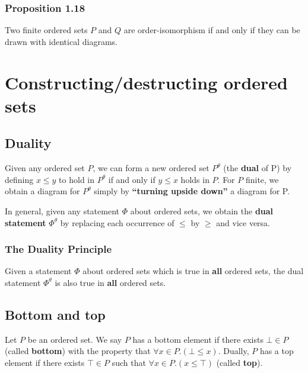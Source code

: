 \documentclass[12pt, letterpaper, oneside]{book}
\begin{document}
\subsubsection{Proposition 1.18}

Two finite ordered sets $P$ and $Q$ are order-isomorphism if and only if they can be drawn with identical diagrams.

\section{Constructing/destructing ordered sets}

\subsection{Duality}

Given any ordered set $P$, we can form a new ordered set $P^{\theta}$ (the \textbf{dual} of P) by defining $x \leqslant y$
to hold in $P^{\theta}$ if and only if $y \leqslant x$ holds in $P$. For $P$ finite, we obtain a diagram for $P^{\theta}$
simply by \textbf{``turning upside down''} a diagram for P.

In general, given any statement $\Phi$ about ordered sets, we obtain the \textbf{dual statement} $\Phi^{\theta}$ by
replacing each occurrence of $\leqslant$ by $\geqslant$ and vice versa.

\subsubsection{The Duality Principle}

Given a statement $\Phi$ about ordered sets which is true in \textbf{all} ordered sets, the dual statement $\Phi^{\theta}$
is also true in \textbf{all} ordered sets.

\subsection{Bottom and top}

Let $P$ be an ordered set. We say $P$ has a bottom element if there exists $\bot \in P$ (called \textbf{bottom}) with
the property that $\forall x \in P. (\bot \leqslant x)$. Dually, $P$ has a top element if there exists $\top \in P$
such that $\forall x \in P. (x \leqslant \top)$ (called \textbf{top}).
\end{document}
